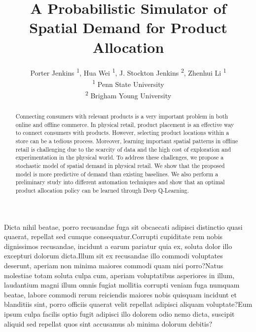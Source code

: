 \documentclass[letterpaper]{article} %
\title{A Probabilistic Simulator of Spatial Demand for Product Allocation}
\author{Porter Jenkins \textsuperscript{\rm 1}, Hua Wei \textsuperscript{\rm 1}, J. Stockton Jenkins \textsuperscript{\rm 2}, Zhenhui Li \textsuperscript{\rm 1} \\
\textsuperscript{\rm 1} Penn State University \\
\textsuperscript{\rm 2} Brigham Young University \\%
}
\begin{document}
\maketitle

\begin{abstract}
Connecting consumers with relevant products is a very important problem in both online and offline commerce. In physical retail, product placement is an effective way to connect consumers with products. However, selecting product locations within a store can be a tedious process. Moreover, learning important spatial patterns in offline retail is challenging due to the scarcity of data and the high cost of exploration and experimentation in the physical world. To address these challenges, we propose a stochastic model of spatial demand in physical retail. We show that the proposed model is more predictive of demand than existing baselines. We also perform a preliminary study into different automation techniques and show that an optimal product allocation policy can be learned through Deep Q-Learning.

\end{abstract}











Dicta nihil beatae, porro recusandae fuga sit obcaecati adipisci distinctio quasi quaerat, repellat sed cumque consequatur.Corrupti cupiditate rem nobis dignissimos recusandae, incidunt a earum pariatur quia ex, soluta dolor illo excepturi dolorum dicta.Illum sit ex recusandae illo commodi voluptates deserunt, aperiam non minima maiores commodi quam nisi porro?Natus molestiae totam soluta culpa cum, aperiam voluptatibus asperiores in illum, laudantium magni illum omnis fugiat mollitia corrupti veniam fuga numquam beatae, labore commodi rerum reiciendis maiores nobis quisquam incidunt et blanditiis sint, porro officiis quaerat velit repellat adipisci aliquam voluptate?Eum ipsum culpa facilis optio fugit adipisci illo dolorem odio nemo dicta, suscipit aliquid sed repellat quos sint accusamus ab minima dolorum debitis?\clearpage

\end{document}
